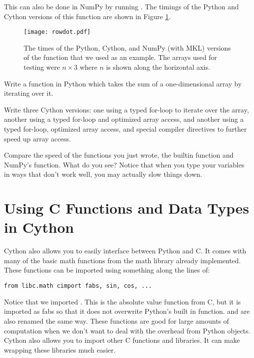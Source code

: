 This can also be done in NumPy by running .
The timings of the Python and Cython versions of this function are shown in Figure \ref{cython:rowdot}.

\begin{figure}
\centering
\texttt{[image: rowdot.pdf]}
\caption{
The times of the Python, Cython, and NumPy (with MKL) versions of the  function that we used as an example.
The arrays used for testing were $n\times 3$ where $n$ is shown along the horizontal axis.
}
\label{cython:rowdot}
\end{figure}

\begin{problem}
Write a function in Python which takes the sum of a one-dimensional array by iterating over it.

Write three Cython versions: one using a typed for-loop to iterate over the array, another using a typed for-loop and optimized array access, and another using a typed for-loop, optimized array access, and special compiler directives to further speed up array access.

Compare the speed of the functions you just wrote, the builtin  function and NumPy's  function.
What do you see?
Notice that when you type your variables in ways that don't work well, you may actually slow things down.
\end{problem}

\section*{Using C Functions and Data Types in Cython}
Cython also allows you to easily interface between Python and C.
It comes with many of the basic math functions from the math library already implemented.
These functions can be imported using something along the lines of:
\begin{lstlisting}
from libc.math cimport fabs, sin, cos, ...
\end{lstlisting}
Notice that we imported .
This is the absolute value function from C, but it is imported as fabs so that it does not overwrite Python's built in  function.
 and  are also renamed the same way.
These functions are good for large amounts of computation when we don't want to deal with the overhead from Python objects.
Cython also allows you to import other C functions and libraries.
It can make wrapping these libraries much easier.

